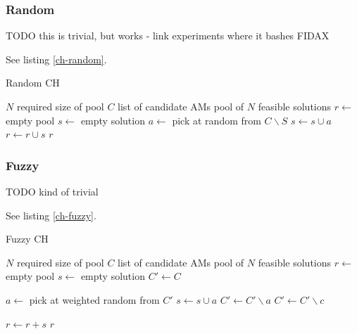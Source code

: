 \documentclass[a4paper,12pt,oneside]{report}
\begin{document}
\subsubsection{Random}

TODO this is trivial, but works - link experiments where it bashes FIDAX

See listing \ref{ch-random}.

\begin{algorithm}
\caption{Random CH}
\label{ch-random}
\begin{algorithmic}
\REQUIRE $N$ required size of pool
\REQUIRE $C$ list of candidate AMs
\ENSURE pool of $N$ feasible solutions
\STATE $r \gets $ empty pool
  \STATE {}
  \STATE $s \gets $ empty solution
    \STATE $a \gets $ pick at random from $C \backslash S$
    \STATE $s \gets s \cup a$
  \ENDWHILE
  \STATE $r \gets r \cup s$
\ENDFOR
\RETURN $r$
\end{algorithmic}
\end{algorithm}

\subsubsection{Fuzzy}

TODO kind of trivial

See listing \ref{ch-fuzzy}.

\begin{algorithm}
\caption{Fuzzy CH}
\label{ch-fuzzy}
\begin{algorithmic}
\REQUIRE $N$ required size of pool
\REQUIRE $C$ list of candidate AMs
\ENSURE pool of $N$ feasible solutions
\STATE $r \gets $ empty pool
  \STATE {}
  \STATE $s \gets $ empty solution
  \STATE $C' \gets C$

    \STATE $a \gets $ pick at weighted random from $C'$
      \STATE $s \gets s \cup a$
      \STATE $C' \gets C' \backslash a$
    \ENDIF
        \STATE {}
        \STATE $C' \gets C' \backslash c$
      \ENDIF
    \ENDFOR
  \ENDWHILE

  \STATE $r \gets r + s$
\ENDFOR
\RETURN $r$
\end{algorithmic}
\end{algorithm}
\end{document}
